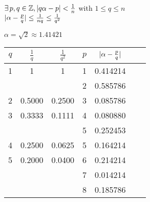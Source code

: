 \documentclass[letterpaper,12pt,fleqn]{article}
\renewcommand{\a}{\alpha}
\renewcommand{\c}{\checkmark}
\begin{document}
\begin{theproof}
  $\exists\,p,q\in\Z,\abs{q\a-p}<\frac{1}{n}$ with $1\le q\le n$ \\
  $\abs{\a-\frac{p}{q}}\le\frac{1}{nq}\le\frac{1}{q^2}$
\end{theproof}

\begin{example}
  $\a=\sqrt{2}\approx1.41421$

  \bigskip

  \begin{tabular}{c|c|c|c|ccc}
    $q$ & $\frac{1}{q}$ & $\frac{1}{q^2}$ & $p$ & $\abs{\a-\frac{p}{q}}$ \\
    \hline
    1 & 1 & 1 & 1 & 0.414214 & \c & \c \\
    &   &   & 2 & 0.585786 & \c & \c \\
    \hline
    2 & 0.5000 & 0.2500 & 3 & 0.085786 & \c & \c \\
    \hline
    3 & 0.3333 & 0.1111 & 4 & 0.080880 & \c & \c \\
    & & & 5 & 0.252453 & \c \\
    \hline
    4 & 0.2500 & 0.0625 & 5 & 0.164214 & \c \\
    \hline
    5 & 0.2000 & 0.0400 & 6 & 0.214214 \\
    & & & 7 & 0.014214 & \c & \c \\
    & & & 8 & 0.185786 & \c \\
  \end{tabular}
\end{example}
\end{document}
